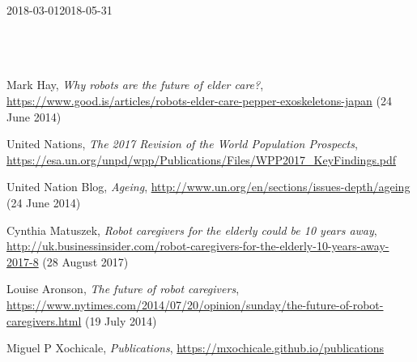 \documentclass[12pt]{article}
\begin{document}
\vspace{10mm}

\begin{ganttchart}[
	hgrid,
	vgrid,
	x unit=1mm,
	time slot format=isodate-yearmonth
	]{2018-03-01}{2018-05-31}
 \\
 \\
 \\
 \\
\end{ganttchart}

\newpage







\newpage

\begin{thebibliography}{10}

Mark Hay,
{\it Why robots are the future of elder care?},
{\url{https://www.good.is/articles/robots-elder-care-pepper-exoskeletons-japan}} (24 June 2014)


United Nations,
{\it The 2017 Revision of the World Population Prospects},
{\url{https://esa.un.org/unpd/wpp/Publications/Files/WPP2017_KeyFindings.pdf}}


United Nation Blog,
{\it Ageing},
{\url{http://www.un.org/en/sections/issues-depth/ageing}} (24 June 2014)


Cynthia Matuszek,
{\it Robot caregivers for the elderly could be 10 years away},
{\url{http://uk.businessinsider.com/robot-caregivers-for-the-elderly-10-years-away-2017-8}} (28 August 2017)


Louise Aronson,
{\it The future of robot caregivers},
{\url{https://www.nytimes.com/2014/07/20/opinion/sunday/the-future-of-robot-caregivers.html}} (19 July 2014)



Miguel P Xochicale,
{\it Publications},
{\url{https://mxochicale.github.io/publications}}


\end{thebibliography}
\end{document}
